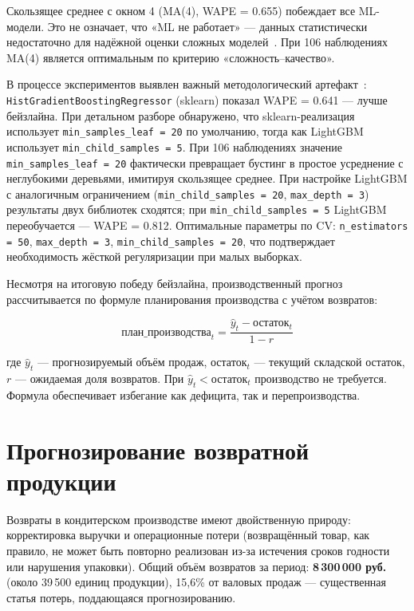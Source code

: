 Скользящее среднее с окном 4 (MA(4), WAPE = 0.655) побеждает все ML-модели. Это не означает, что «ML не работает» --- данных статистически недостаточно для надёжной оценки сложных моделей~\cite{makridakis2018m4}. При 106 наблюдениях MA(4) является оптимальным по критерию «сложность--качество».

В процессе экспериментов выявлен важный методологический артефакт~\cite{sculley2015hidden}: \texttt{HistGradientBoostingRegressor} (sklearn) показал WAPE = 0.641 --- лучше бейзлайна. При детальном разборе обнаружено, что sklearn-реализация использует \texttt{min\_samples\_leaf = 20} по умолчанию, тогда как LightGBM использует \texttt{min\_child\_samples = 5}. При 106 наблюдениях значение \texttt{min\_samples\_leaf = 20} фактически превращает бустинг в простое усреднение с неглубокими деревьями, имитируя скользящее среднее. При настройке LightGBM с аналогичным ограничением (\texttt{min\_child\_samples = 20}, \texttt{max\_depth = 3}) результаты двух библиотек сходятся; при \texttt{min\_child\_samples = 5} LightGBM переобучается --- WAPE = 0.812. Оптимальные параметры по CV: \texttt{n\_estimators = 50}, \texttt{max\_depth = 3}, \texttt{min\_child\_samples = 20}, что подтверждает необходимость жёсткой регуляризации при малых выборках.

Несмотря на итоговую победу бейзлайна, производственный прогноз рассчитывается по формуле планирования производства с учётом возвратов:

\begin{equation}
\text{план\_производства}_t = \frac{\hat{y}_t - \text{остаток}_t}{1 - r}
\end{equation}

где $\hat{y}_t$ --- прогнозируемый объём продаж, $\text{остаток}_t$ --- текущий складской остаток, $r$ --- ожидаемая доля возвратов. При $\hat{y}_t < \text{остаток}_t$ производство не требуется. Формула обеспечивает избегание как дефицита, так и перепроизводства.

\section{Прогнозирование возвратной продукции}

Возвраты в кондитерском производстве имеют двойственную природу: корректировка выручки и операционные потери (возвращённый товар, как правило, не может быть повторно реализован из-за истечения сроков годности или нарушения упаковки). Общий объём возвратов за период: \textbf{8\,300\,000 руб.} (около 39\,500 единиц продукции), 15,6\% от валовых продаж --- существенная статья потерь, поддающаяся прогнозированию.

